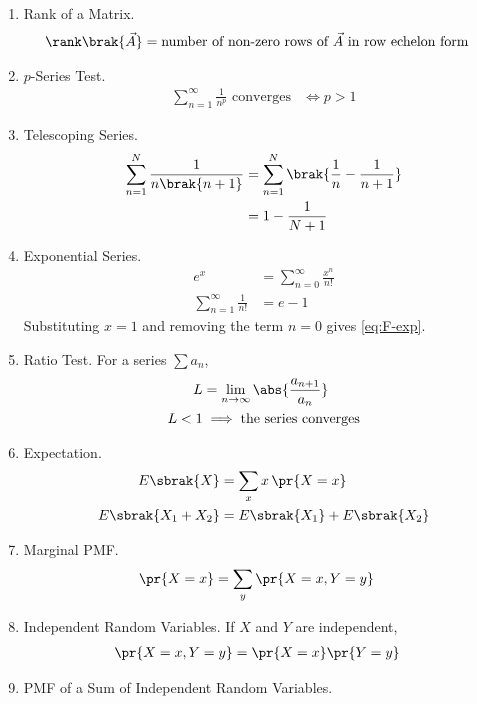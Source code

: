 \begin{enumerate}[label=\thesubsection.\arabic*, ref=\thesubsection.\theenumi]
\item Rank of a Matrix.
\begin{align}
\rank\brak{\vec{A}} &= \text{number of non-zero rows of } \vec{A} \text{ in row echelon form}
\label{eq:F-rank-pivots}
\end{align}
\item $p$-Series Test.
\begin{align}
\sum_{n=1}^{\infty} \frac{1}{n^{p}} \text{ converges} &\iff p > 1
\label{eq:F-pseries}
\end{align}
\item Telescoping Series.
\begin{align}
\sum_{n=1}^{N} \frac{1}{n\brak{n+1}} &= \sum_{n=1}^{N} \brak{\frac{1}{n} - \frac{1}{n+1}}
\\
&= 1 - \frac{1}{N+1}
\label{eq:F-telescope}
\end{align}
\item Exponential Series.
\begin{align}
e^x &= \sum_{n=0}^{\infty} \frac{x^n}{n!}
\\
\sum_{n=1}^{\infty} \frac{1}{n!} &= e - 1
\label{eq:F-exp}
\end{align}
\solution
Substituting $x = 1$ and removing the term $n = 0$ gives \eqref{eq:F-exp}.
\item Ratio Test. For a series $\sum a_n$,
\begin{align}
L &= \lim_{n \to \infty} \abs{\frac{a_{n+1}}{a_n}}
\\
L < 1 &\implies \text{the series converges}
\label{eq:F-ratio}
\end{align}
\item Expectation.
\begin{align}
E\sbrak{X} &= \sum_{x} x \, \pr{X = x}
\\
E\sbrak{X_1 + X_2} &= E\sbrak{X_1} + E\sbrak{X_2}
\label{eq:F-expect}
\end{align}
\item Marginal PMF.
\begin{align}
\pr{X = x} &= \sum_{y} \pr{X = x, Y = y}
\label{eq:F-marginal}
\end{align}
\item Independent Random Variables. If $X$ and $Y$ are independent,
\begin{align}
\pr{X = x, Y = y} &= \pr{X = x}\pr{Y = y}
\label{eq:F-indep}
\end{align}
\item PMF of a Sum of Independent Random Variables.

\end{enumerate}
